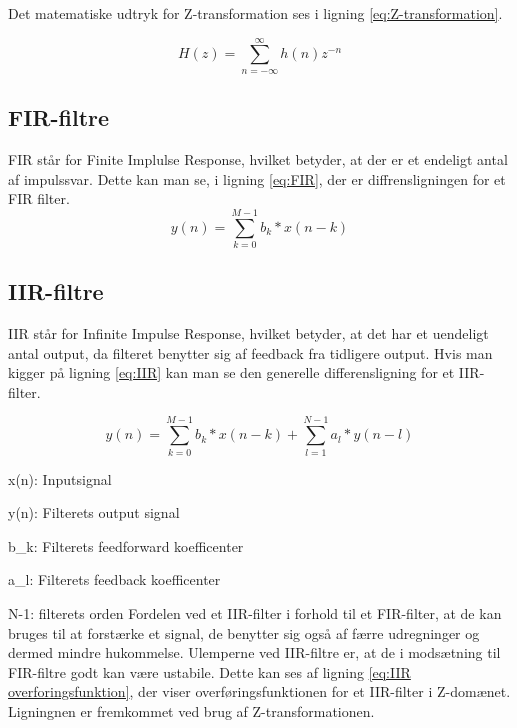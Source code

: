 Det matematiske udtryk for Z-transformation ses i ligning \ref{eq:Z-transformation}.

\begin{equation}\label{eq:Z-transformation}
{H(z)} = \displaystyle\sum_{n=-\infty }^{\infty} {h(n)z^{-n}}
\end{equation}
 
\subsection{FIR-filtre}
FIR står for Finite Implulse Response, hvilket betyder, at der er et endeligt antal af impulssvar.
Dette kan man se, i ligning \eqref{eq:FIR}, der er diffrensligningen for et FIR filter.
\begin{equation}\label{eq:FIR}
{y(n)} = \displaystyle\sum_{k=0}^{M-1} {b_{k}*x(n-k)}
\end{equation}


\subsection{IIR-filtre}
IIR står for Infinite Impulse Response, hvilket betyder, at det har et uendeligt antal output, da filteret benytter sig af feedback fra tidligere output. Hvis man kigger på ligning \eqref{eq:IIR} kan man se den generelle differensligning for et IIR-filter.


\begin{equation}\label{eq:IIR}
{y(n)} = \displaystyle\sum_{k=0}^{M-1} {b_{k}*x(n-k)}+\displaystyle\sum_{l=1}^{N-1} {a_{l}*y(n-l)}
\end{equation}

x(n): Inputsignal

y(n): Filterets output signal

b_{k}: Filterets feedforward koefficenter

a_{l}: Filterets feedback koefficenter

N-1: filterets orden
\newline
\newline
Fordelen ved et IIR-filter i forhold til et FIR-filter, at de kan bruges til at forstærke et signal, de benytter sig også af færre udregninger og dermed mindre hukommelse. 
Ulemperne ved IIR-filtre er, at de i modsætning til FIR-filtre godt kan være ustabile. 
Dette kan ses af ligning \eqref{eq:IIR overforingsfunktion}, der viser overføringsfunktionen for et IIR-filter i Z-domænet. Ligningnen er fremkommet ved brug af Z-transformationen.

